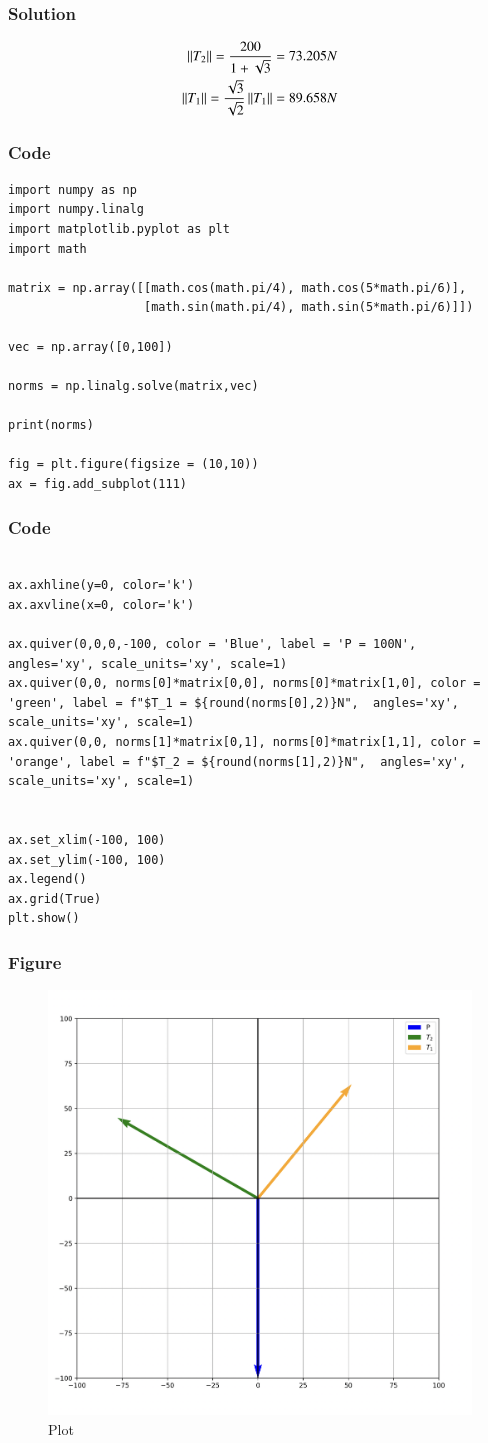 \documentclass{beamer}
\begin{document}
\begin{frame}[fragile]
    \frametitle{Solution}
\begin{align}
    \left\lVert T_2\right\rVert = \frac{200}{1+\sqrt{3}} = 73.205N\\
    \left\lVert T_1\right\rVert = \frac{\sqrt{3}}{\sqrt{2}}\left\lVert T_1\right\rVert = 89.658N
\end{align}
\end{frame}

\begin{frame}[fragile]
    \frametitle{Code}
\begin{lstlisting}
import numpy as np
import numpy.linalg
import matplotlib.pyplot as plt
import math

matrix = np.array([[math.cos(math.pi/4), math.cos(5*math.pi/6)],
                   [math.sin(math.pi/4), math.sin(5*math.pi/6)]])

vec = np.array([0,100])

norms = np.linalg.solve(matrix,vec)

print(norms)

fig = plt.figure(figsize = (10,10))
ax = fig.add_subplot(111)
\end{lstlisting}
\end{frame}
\begin{frame}[fragile]
    \frametitle{Code}
\begin{lstlisting}

ax.axhline(y=0, color='k')
ax.axvline(x=0, color='k')

ax.quiver(0,0,0,-100, color = 'Blue', label = 'P = 100N',  angles='xy', scale_units='xy', scale=1)
ax.quiver(0,0, norms[0]*matrix[0,0], norms[0]*matrix[1,0], color = 'green', label = f"$T_1 = ${round(norms[0],2)}N",  angles='xy', scale_units='xy', scale=1)
ax.quiver(0,0, norms[1]*matrix[0,1], norms[0]*matrix[1,1], color = 'orange', label = f"$T_2 = ${round(norms[1],2)}N",  angles='xy', scale_units='xy', scale=1)


ax.set_xlim(-100, 100)
ax.set_ylim(-100, 100)
ax.legend()
ax.grid(True)
plt.show()
\end{lstlisting}
\end{frame}

\begin{frame}[fragile]
    \frametitle{Figure}
\begin{figure}[H]
    \centering
    \includegraphics[width=0.6\columnwidth]{Figs/123302.png}
    \caption{Plot}
    \label{fig:placeholder}
\end{figure}
\end{frame}
\end{document}
